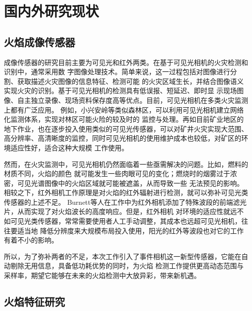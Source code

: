 \section{国内外研究现状}

\subsection{火焰成像传感器}

成像传感器的研究目前主要为可见光和红外两类。在基于可见光相机的火灾检测和识别中，通常采用数
字图像处理技术。简单来说，这一过程包括对图像进行分割、获取描述火灾图像的信息特征、检测可能
的火灾区域生长，并结合图像语义实现火灾的识别。基于可见光相机的检测具有低误报、短延迟、即时显
示现场图像、自主独立录像、现场资料保存度高等优点。目前，可见光相机在多类火灾监测上都有广泛应用。
例如，小兴安岭等类似森林区，可以利用可见光相机建立网络化监测体系，实现对林区可能火险的较及时的
监控与处理\cite{liujinxin}。再如目前矿业地区的地下作业，也在逐步投入使用类似的可见光传感器，可以对矿井火灾实现大范围、
高分辨率、高清晰度的监控，同时可见光相机的使用维护成本也较低，对矿区的环境适应性好，适合这种大规模
工作使用\cite{wyb}。

然而，在火灾监测中，可见光相机仍然面临着一些亟需解决的问题。比如，燃料的材质不同，火焰的颜色
就可能发生一些肉眼可见的变化；燃烧时的烟雾过于浓密，可见光谱图像中的火焰区域就可能被遮盖，从而导致一些
无法预见的影响。相较之下，红外相机工作原理是对火焰的红外辐射进行检测，就可以弥补可见光类传感器的上述不足。
Burnett等人\cite{burnett2018low}在工作中为红外相机添加了特殊波段的前端滤光片，从而实现了对火焰波长的高度响应。但是，红外相机
对环境的适应性就远不如可见光类传感器，常常需要使用者人工手动调整，其成本也远超可见光相机，往往要适当地
降低分辨度来大规模布局投入使用，阳光的红外等波段也对它的工作有着不小的影响。

所以，为了弥补两者的不足，本次工作引入了事件相机这一新型传感器，它能在自动剔除无用信息，具备低功耗优势的同时，为火焰
检测工作提供更高动态范围与采样率，期望它能够在未来的火焰检测中大放异彩，带来新机遇。

\subsection{火焰特征研究}

